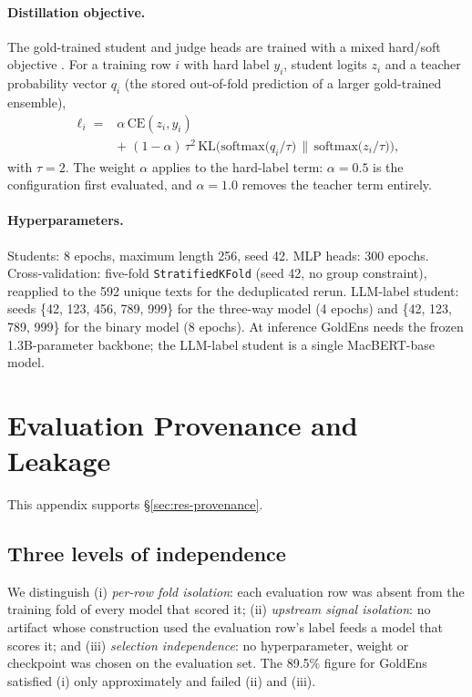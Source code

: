 \paragraph{Distillation objective.}
The gold-trained student and judge heads are trained with a mixed
hard/soft objective \citep{hinton2015distilling}. For a training row
$i$ with hard label $y_i$, student logits $z_i$ and a teacher
probability vector $q_i$ (the stored out-of-fold prediction of a
larger gold-trained ensemble),
{\small
\begin{equation}
  \begin{aligned}
  \ell_i = {}& \alpha\,\mathrm{CE}(z_i, y_i) \\
             & +\; (1-\alpha)\,\tau^{2}\,
  \mathrm{KL}\!\Big(\mathrm{softmax}\big(q_i/\tau\big)\,\Big\|\,
  \mathrm{softmax}\big(z_i/\tau\big)\Big),
  \end{aligned}
  \label{eq:kd}
\end{equation}
}%
with $\tau{=}2$. The weight $\alpha$ applies to the hard-label term:
$\alpha{=}0.5$ is the configuration first evaluated, and
$\alpha{=}1.0$ removes the teacher term entirely.

\paragraph{Hyperparameters.}
Students: 8 epochs, maximum length 256, seed 42. MLP heads: 300
epochs. Cross-validation: five-fold \texttt{StratifiedKFold} (seed
42, no group constraint), reapplied to the 592 unique texts for the
deduplicated rerun. LLM-label student: seeds \{42, 123, 456, 789,
999\} for the three-way model (4 epochs) and \{42, 123, 789, 999\} for
the binary model (8 epochs). At inference GoldEns needs the frozen
1.3B-parameter backbone; the LLM-label student is a single
MacBERT-base model.

\section{Evaluation Provenance and Leakage}
\label{app:audit}

This appendix supports \S\ref{sec:res-provenance}.

\subsection{Three levels of independence}
We distinguish (i) \emph{per-row fold isolation}: each evaluation row
was absent from the training fold of every model that scored it;
(ii) \emph{upstream signal isolation}: no artifact whose construction
used the evaluation row's label feeds a model that scores it; and
(iii) \emph{selection independence}: no hyperparameter, weight or
checkpoint was chosen on the evaluation set. The 89.5\% figure for
GoldEns satisfied (i) only approximately and failed (ii) and (iii).

